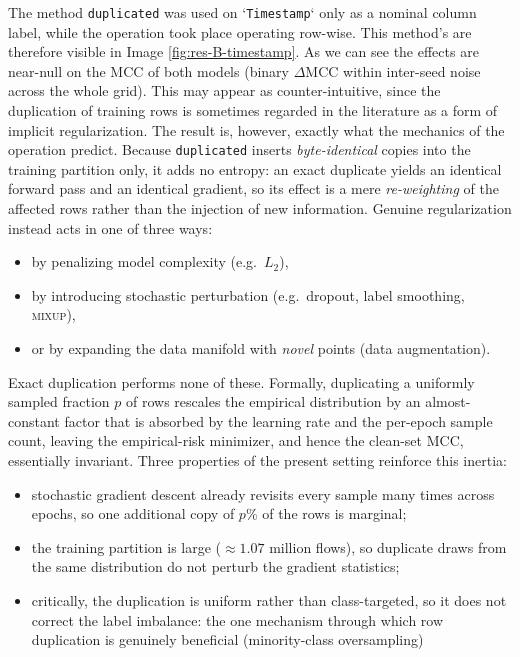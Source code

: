 \documentclass[../main.tex]{subfiles}
\begin{document}
The method \texttt{duplicated} was used on `\texttt{Timestamp}` only as a nominal column label, while the operation took place operating row-wise. This method's are therefore visible in Image \ref{fig:res-B-timestamp}. As we can see the effects are near-null on the MCC of both models (binary $\Delta\mathrm{MCC}$ within inter-seed noise across the whole grid). This may appear as counter-intuitive, since the duplication of training rows is sometimes regarded in the literature as a form of implicit regularization. The result is, however, exactly what the mechanics of the operation predict. Because \texttt{duplicated} inserts \emph{byte-identical} copies into the training partition only, it adds no entropy: an exact duplicate yields an identical forward pass and an identical gradient, so its effect is a mere \emph{re-weighting} of the affected rows rather than the injection of new information. Genuine regularization instead acts in one of three ways:
\begin{itemize}
    \item by penalizing model complexity (e.g.\ $L_2$),
    \item by introducing stochastic perturbation (e.g.\ dropout, label smoothing, \textsc{mixup}),
    \item or by expanding the data manifold with \emph{novel} points (data augmentation).
\end{itemize}
Exact duplication performs none of these. Formally, duplicating a uniformly sampled fraction $p$ of rows rescales the empirical distribution by an almost-constant factor that is absorbed by the learning rate and the per-epoch sample count, leaving the
empirical-risk minimizer, and hence the clean-set MCC, essentially invariant.
Three properties of the present setting reinforce this inertia: 
\begin{itemize}
    \item stochastic gradient descent already revisits every sample many times across epochs, so one additional copy of $p\%$ of the rows is marginal;
    \item the training partition is large ($\approx 1.07$ million flows), so duplicate draws from the same distribution do not perturb the gradient statistics;
    \item critically, the duplication is uniform rather than class-targeted, so it does not correct the label imbalance: the one mechanism through which row duplication is genuinely beneficial (minority-class oversampling)
\end{itemize}
\end{document}
